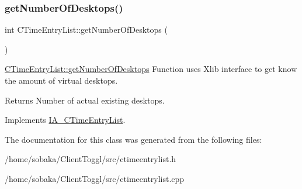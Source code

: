 \subsubsection{\texorpdfstring{get\+Number\+Of\+Desktops()}{getNumberOfDesktops()}}
{\footnotesize\ttfamily int C\+Time\+Entry\+List\+::get\+Number\+Of\+Desktops (\begin{DoxyParamCaption}{ }\end{DoxyParamCaption})\hspace{0.3cm}{\ttfamily [virtual]}}



\hyperlink{classCTimeEntryList_a77da074f7eafb033dd6e85f1859b283e}{C\+Time\+Entry\+List\+::get\+Number\+Of\+Desktops} Function uses Xlib interface to get know the amount of virtual desktops. 

\begin{DoxyReturn}{Returns}
Number of actual existing desktops. 
\end{DoxyReturn}


Implements \hyperlink{classIA__CTimeEntryList}{I\+A\+\_\+\+C\+Time\+Entry\+List}.



The documentation for this class was generated from the following files\+:\begin{DoxyCompactItemize}
\item 
/home/sobaka/\+Client\+Toggl/src/ctimeentrylist.\+h\item 
/home/sobaka/\+Client\+Toggl/src/ctimeentrylist.\+cpp\end{DoxyCompactItemize}
